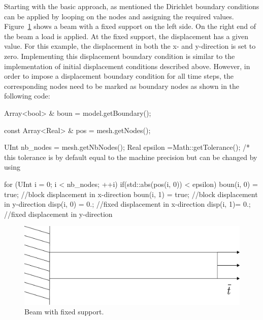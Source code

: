 Starting with the basic approach, as mentioned the Dirichlet boundary
conditions can be applied by looping on the nodes and assigning the
required values. Figure~\ref{fig:smm:dirichlet_bc} shows a beam with a
fixed support on the left side. On the right end of the beam a load is
applied. At the fixed support, the displacement has a given value. For
this example, the displacement in both the x- and y-direction is set
to zero. Implementing this displacement boundary condition is similar
to the implementation of initial displacement conditions described
above. However, in order to impose a displacement boundary condition
for all time steps, the corresponding nodes need to be marked as
boundary nodes as shown in the following code:

\begin{cpp} 
Array<bool> & boun = model.getBoundary();

const Array<Real> & pos = mesh.getNodes();

UInt nb_nodes = mesh.getNbNodes(); 
Real epsilon =Math::getTolerance(); 
/* this tolerance is by default equal to the machine precision but can be changed by using %

for (UInt i = 0; i < nb_nodes; ++i) { 
  if(std::abs(pos(i, 0)) < epsilon) { 
    boun(i, 0) = true; //block displacement in x-direction
    boun(i, 1) = true; //block displacement in y-direction
    disp(i, 0) = 0.; //fixed displacement in x-direction 
    disp(i, 1)= 0.; //fixed displacement in y-direction 
  } 
}
\end{cpp}
\begin{figure}[!htb] 
  \centering
  \includegraphics[scale=0.4]{figures/dirichlet}
  \caption{Beam with fixed support.\label{fig:smm:dirichlet_bc}}
\end{figure}

